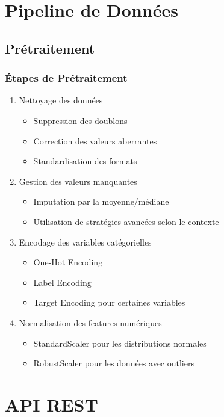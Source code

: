 \documentclass[12pt,a4paper]{report}
\begin{document}
\chapter{Pipeline de Données}
\section{Prétraitement}
\subsection{Étapes de Prétraitement}
\begin{enumerate}
    \item Nettoyage des données
    \begin{itemize}
        \item Suppression des doublons
        \item Correction des valeurs aberrantes
        \item Standardisation des formats
    \end{itemize}
    
    \item Gestion des valeurs manquantes
    \begin{itemize}
        \item Imputation par la moyenne/médiane
        \item Utilisation de stratégies avancées selon le contexte
    \end{itemize}
    
    \item Encodage des variables catégorielles
    \begin{itemize}
        \item One-Hot Encoding
        \item Label Encoding
        \item Target Encoding pour certaines variables
    \end{itemize}
    
    \item Normalisation des features numériques
    \begin{itemize}
        \item StandardScaler pour les distributions normales
        \item RobustScaler pour les données avec outliers
    \end{itemize}
\end{enumerate}

\chapter{API REST}
\end{document}
